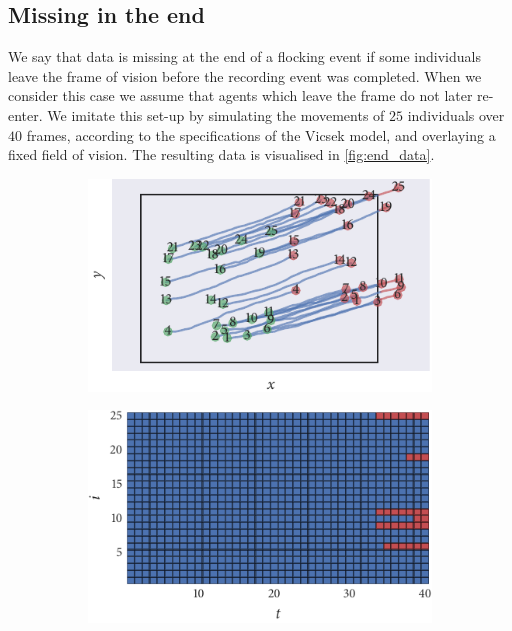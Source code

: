 \subsection{Missing in the end}

We say that data is missing at the end of a flocking event if some individuals
leave the frame of vision before the recording event was completed. When we
consider this case we assume that agents which leave the frame do not later
re-enter. We imitate this set-up by simulating the movements of $25$
individuals over $40$ frames, according to the specifications of the Vicsek
model, and overlaying a fixed field of vision. The resulting data is visualised
in \cref{fig:end_data}.

\begin{figure}[tbp]
  \begin{subfigure}[b]{0.5\textwidth}
    \includegraphics{end/data.pdf}
    \caption{}
    \label{subfig:end_data}
  \end{subfigure}%
  \begin{subfigure}[b]{0.5\textwidth}
    \includegraphics{end/missing_array.pdf}

\end{subfigure}
\end{figure}
